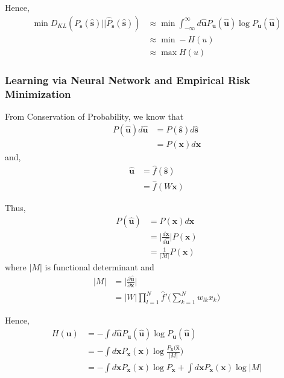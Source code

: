 Hence, 
\begin{align*}
	\min D_{KL} ( P_{\boldsymbol{s}}(\boldsymbol{\hat{s}}) || \hat{P}_{\boldsymbol{s}}(\boldsymbol{\hat{s}}) ) &\approx \min  \int_{-\infty}^{\infty} d\boldsymbol{\hat{u}} P_{\boldsymbol{u}} (\boldsymbol{\hat{u}}) \log  P_{\boldsymbol{u}}(\boldsymbol{\hat{u}})  \\
		& \approx \min -H(u) \\
		& \approx \max H(u) \tag*{(Informax Principle)}
\end{align*}

\subsubsection{Learning via Neural Network and Empirical Risk Minimization} 
From Conservation of Probability, we know that 
\begin{align*}
	 P(\boldsymbol{\hat{u}})d\boldsymbol{\hat{u}} &= P(\boldsymbol{\hat{s}})d\boldsymbol{\hat{s}} \\ 
	 &= P(\boldsymbol{x})d\boldsymbol{x} 
\end{align*}
and, 
\begin{align*}
	 \boldsymbol{\hat{u}} &= \hat{f}(\boldsymbol{\hat{s}}) \\
	 &= \hat{f}(W\boldsymbol{{x}})
\end{align*}

Thus, 
\begin{align*}
		 P(\boldsymbol{\hat{u}})  &=  P(\boldsymbol{x})d\boldsymbol{x} 
\\
&=  \Bigg | \frac{d\boldsymbol{x}}{d\boldsymbol{\hat{u}}} \Bigg | P(\boldsymbol{x}) \\
&=   \frac{1}{|M|} P(\boldsymbol{x}) 
\end{align*}
where $|M|$ is functional determinant and 
\begin{align*}
|M| &= \Bigg| \frac{\partial \boldsymbol{\hat{u}}}{ \partial \boldsymbol{x}}\Bigg|	\\
&= |W| \prod_{l=1}^{N} \hat{f}' \bigg (\sum_{k=1}^{N} w_{lk}x_k \bigg )
\end{align*}

Hence,
\begin{align*}
	H(\boldsymbol{u}) &= - \int d\boldsymbol{\hat{u}} P_{\boldsymbol{u}}(\boldsymbol{\hat{
	u}})\log P_{\boldsymbol{u}}(\boldsymbol{\hat{
	u}}) \\
	&= - \int d\boldsymbol{x} P_{\boldsymbol{x}}(\boldsymbol{x})\log \frac{P_{\boldsymbol{x}}(\boldsymbol{\hat{x}}}{|M|}) \\
	&= - \int d\boldsymbol{x} P_{\boldsymbol{x}}(\boldsymbol{x})\log P_{\boldsymbol{x}} +
	\int d\boldsymbol{x} P_{\boldsymbol{x}}(\boldsymbol{x})\log |M| 
\end{align*}

